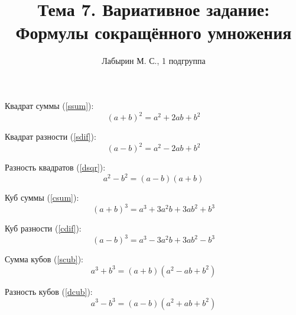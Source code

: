 \documentclass[12pt]{article}
\author{Лабырин М. С., 1 подгруппа}
\title{Тема 7. Вариативное задание:\\Формулы сокращённого умножения}
\begin{document}
\maketitle

Квадрат суммы (\ref{ssum}):
\begin{equation}
  {(a + b)}^2 = a^2 + 2ab + b^2
  \label{ssum}
\end{equation}

Квадрат разности (\ref{sdif}):
\begin{equation}
  {(a - b)}^2 = a^2 - 2ab + b^2
  \label{sdif}
\end{equation}

Разность квадратов (\ref{dsqr}):
\begin{equation}
  a^2 - b^2 = (a - b) (a + b)
  \label{dsqr}
\end{equation}

Куб суммы (\ref{csum}):
\begin{equation}
  {(a + b)}^3 = a^3 + 3a^2 b + 3a b^2 + b^3
  \label{csum}
\end{equation}

Куб разности (\ref{cdif}):
\begin{equation}
  {(a - b)}^3 = a^3 - 3a^2 b + 3a b^2 - b^3
  \label{cdif}
\end{equation}

Сумма кубов (\ref{scub}):
\begin{equation}
  a^3 + b^3 = (a + b) (a^2 - ab + b^2)
  \label{scub}
\end{equation}

Разность кубов (\ref{dcub}):
\begin{equation}
  a^3 - b^3 = (a - b) (a^2 + ab + b^2)
  \label{dcub}
\end{equation}
\end{document}
